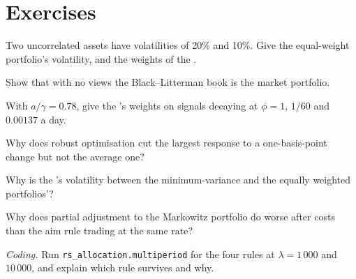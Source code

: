 \section{Exercises}

\begin{exercise}[$\star$]\label{exo:rs:portfolio-construction-ii:1}
Two uncorrelated assets have volatilities of 20\% and 10\%. Give the equal-weight portfolio's volatility, and the weights of the .
\end{exercise}

\begin{exercise}[$\star$]\label{exo:rs:portfolio-construction-ii:2}
Show that with no views the Black--Litterman book is the market portfolio.
\end{exercise}

\begin{exercise}[$\star$]\label{exo:rs:portfolio-construction-ii:3}
With $a/\gamma = 0.78$, give the 's weights on signals decaying at $\phi = 1$, $1/60$ and $0.00137$ a day.
\end{exercise}

\begin{exercise}[$\star\star$]\label{exo:rs:portfolio-construction-ii:4}
Why does robust optimisation cut the largest response to a one-basis-point change but not the average one?
\end{exercise}

\begin{exercise}[$\star\star$]\label{exo:rs:portfolio-construction-ii:5}
Why is the 's volatility between the minimum-variance and the equally weighted portfolios'?
\end{exercise}

\begin{exercise}[$\star\star$]\label{exo:rs:portfolio-construction-ii:6}
Why does partial adjustment to the Markowitz portfolio do worse after costs than the aim rule trading at the same rate?
\end{exercise}

\begin{exercise}[$\star\star\star$]\label{exo:rs:portfolio-construction-ii:7}
\emph{Coding.} Run \texttt{rs\_allocation.multiperiod} for the four rules at $\lambda = 1\,000$ and $10\,000$, and explain which rule survives and why.
\end{exercise}

